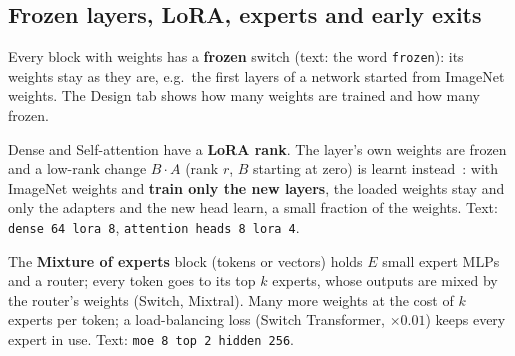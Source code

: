 \documentclass[11pt,a4paper]{article}
\newcommand{\ui}[1]{\textbf{\textsf{#1}}}
\begin{document}
\subsection{Frozen layers, LoRA, experts and early exits}
\label{sec:adapters}
\begin{description}[nosep]
  \item[Frozen.] Every block with weights has a \ui{frozen} switch (text: the word \texttt{frozen}): its weights stay as they are, e.g.\
        the first layers of a network started from ImageNet weights. The Design tab shows how many weights are trained and how many frozen.
  \item[LoRA.] Dense and Self-attention have a \ui{LoRA rank}. The layer's own weights are frozen and a low-rank change $B\cdot A$ (rank
        $r$, $B$ starting at zero) is learnt instead~\cite{hu2021lora}: with ImageNet weights and \ui{train only the new layers}, the loaded
        weights stay and only the adapters and the new head learn, a small fraction of the weights. Text: \texttt{dense 64 lora 8},
        \texttt{attention heads 8 lora 4}.
  \item[Mixture of experts.] The \ui{Mixture of experts} block (tokens or vectors) holds $E$ small expert MLPs and a router; every token
        goes to its top $k$ experts, whose outputs are mixed by the router's weights (Switch, Mixtral). Many more weights at the cost of $k$
        experts per token; a load-balancing loss (Switch Transformer, $\times 0.01$) keeps every expert in use. Text: \texttt{moe 8 top 2
        hidden 256}.


\end{description}
\end{document}
